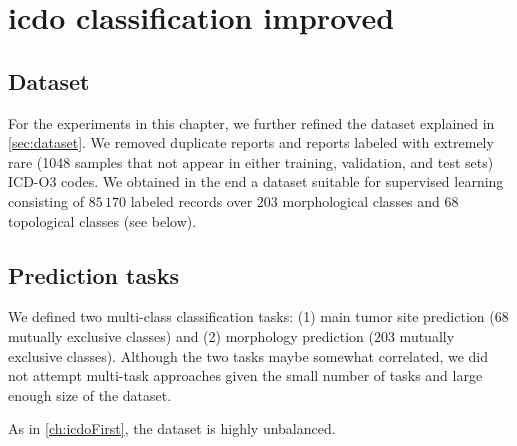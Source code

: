 \chapter{\ac{icdo} classification improved}
\label{ch:icdo}

\section{Dataset}
For the experiments in this chapter, we further refined the dataset
explained in \cref{sec:dataset}. We removed duplicate
reports and reports labeled with extremely rare (1048
samples that not
appear in either training, validation, and test sets) ICD-O3 codes. We
obtained in the end 
a dataset suitable for supervised learning consisting of $85\,170$
labeled records over $203$ morphological classes and $68$
topological classes (see below).

\section{Prediction tasks}
We defined two multi-class classification tasks: (1) main tumor site
prediction ($68$ mutually exclusive classes) and (2) morphology
prediction ($203$ mutually exclusive
classes). Although the two tasks maybe somewhat correlated, we did not
attempt multi-task approaches given the small number of tasks and
large enough size of the dataset.

As in \cref{ch:icdoFirst}, the dataset is highly unbalanced.

